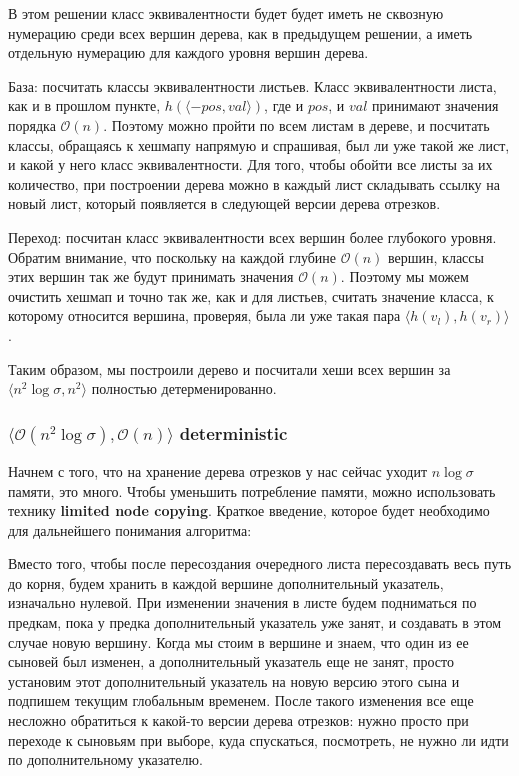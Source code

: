 В этом решении класс эквивалентности будет будет иметь не сквозную нумерацию среди всех вершин дерева, как в предыдущем решении, а иметь отдельную нумерацию для каждого уровня вершин дерева.

База: посчитать классы эквивалентности листьев. Класс эквивалентности листа, как и в прошлом пункте, $h(\langle -pos, val \rangle)$, где и $pos$, и $val$ принимают значения порядка $\mathcal{O}(n)$. Поэтому можно пройти по всем листам в дереве, и посчитать классы, обращаясь к хешмапу напрямую и спрашивая, был ли уже такой же лист, и какой у него класс эквивалентности. Для того, чтобы обойти все листы за их количество, при построении дерева можно в каждый лист складывать ссылку на новый лист, который появляется в следующей версии дерева отрезков.

Переход: посчитан класс эквивалентности всех вершин более глубокого уровня. Обратим внимание, что поскольку на каждой глубине $\mathcal{O}(n)$ вершин, классы этих вершин так же будут принимать значения $\mathcal{O}(n)$. Поэтому мы можем очистить хешмап и точно так же, как и для листьев, считать значение класса, к которому относится вершина, проверяя, была ли уже такая пара $\langle h(v_l), h(v_r) \rangle$.

Таким образом, мы построили дерево и посчитали хеши всех вершин за $\langle n^2 \log \sigma, n^2 \rangle$ полностью детерменированно.


\subsubsection{$\langle \mathcal{O}(n^2 \log \sigma), \mathcal{O}(n) \rangle$ deterministic}

Начнем с того, что на хранение дерева отрезков у нас сейчас уходит $n \log \sigma$ памяти, это много. Чтобы уменьшить потребление памяти, можно использовать технику \textbf{limited node copying}. Краткое введение, которое будет необходимо для дальнейшего понимания алгоритма: %

Вместо того, чтобы после пересоздания очередного листа пересоздавать весь путь до корня, будем хранить в каждой вершине дополнительный указатель, изначально нулевой. При изменении значения в листе будем подниматься по предкам, пока у предка дополнительный указатель уже занят, и создавать в этом случае новую вершину. Когда мы стоим в вершине и знаем, что один из ее сыновей был изменен, а дополнительный указатель еще не занят, просто установим этот дополнительный указатель на новую версию этого сына и подпишем текущим глобальным временем. После такого изменения все еще несложно обратиться к какой-то версии дерева отрезков: нужно просто при переходе к сыновьям при выборе, куда спускаться, посмотреть, не нужно ли идти по дополнительному указателю.

